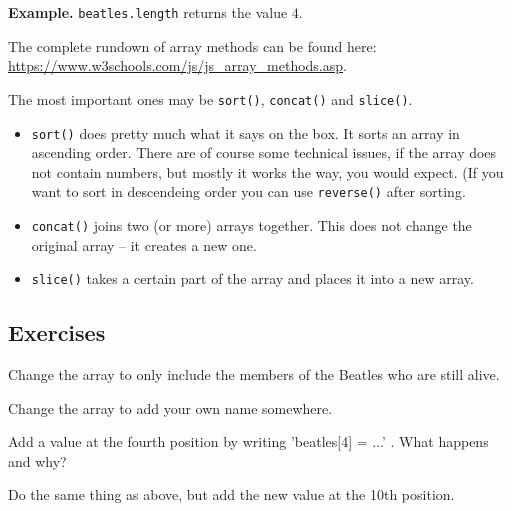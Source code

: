 \documentclass[11pt,a4paper]{report}
\begin{document}
{\bf Example.} \verb|beatles.length| returns the value $4$.

The complete rundown of array methods can be found here:
\url{https://www.w3schools.com/js/js_array_methods.asp}.

The most important ones may be \verb|sort()|, \verb|concat()| and \verb|slice()|. 

\begin{itemize}
\item \verb|sort()| does pretty much what it says on the box. It sorts an array in ascending order. There are of course some technical issues, if the array does not contain numbers, but mostly it works the way, you would expect. (If you want to sort in descendeing order you can use \verb|reverse()| after sorting.
\item \verb|concat()| joins two (or more) arrays together. This does not change the original array -- it creates a new one.
\item \verb|slice()| takes a certain part of the array and places it into a new array.
\end{itemize}



\subsection{Exercises}

\begin{ex}
Change the array to only include the members of the Beatles who are still alive.
\end{ex}

\begin{ex}
Change the array to add your own name somewhere.
\end{ex}

\begin{ex}
Add a value at the fourth position by writing 'beatles[4] = ...' . What happens and why?
\end{ex}

\begin{ex}
Do the same thing as above, but add the new value at the 10th position.
\end{ex}
\end{document}

